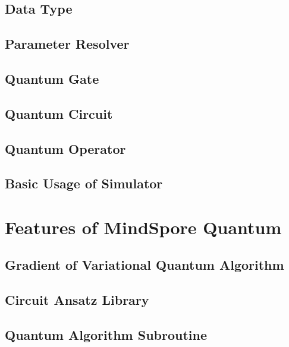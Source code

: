 \documentclass[pra,twocolumn,superscriptaddress,floatfix,nofootinbib,amsmath,amssymb]{revtex4-1}
\begin{document}
\subsection{Data Type}


\subsection{Parameter Resolver}


\subsection{Quantum Gate}


\subsection{Quantum Circuit}


\subsection{Quantum Operator}


\subsection{Basic Usage of Simulator}



\section{Features of MindSpore Quantum}

\subsection{Gradient of Variational Quantum Algorithm}


\subsection{Circuit Ansatz Library}


\subsection{Quantum Algorithm Subroutine}

\end{document}
